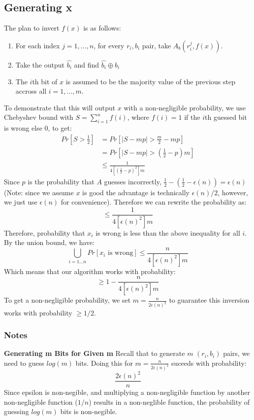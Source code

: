 \documentclass[11pt]{article}
\begin{document}
\subsection{Generating x}
The plan to invert $f(x)$ is as follows:
\begin{enumerate}
    \item For each index $j=1,...,n$, for every $r_i,b_i$ pair, take $A_b(r_i^j, f(x))$.
    \item Take the output $\hat{b_i}$ and find $\hat{b_i} \oplus {b_i}$
    \item The $i$th bit of $x$ is assumed to be the majority value of the previous step accross all $i=1,...,m$.
\end{enumerate}
To demonstrate that this will output $x$ with a non-negligible probability, we use Chebyshev bound with $S = \sum_{i=1}^n f(i)$, where $f(i) = 1$ if the $i$th guessed bit is wrong else 0, to get:
\begin{align*}
    Pr[S > \frac{1}{2}] &= Pr[|S-mp| > \frac{m}{2}-mp]\\
    &= Pr[|S-mp| > (\frac{1}{2}-p)m]\\
    &\leq \frac{1}{4[(\frac{1}{2}-p)^2]m}
\end{align*}
Since $p$ is the probability that $A$ guesses incorrectly, $\frac{1}{2}-(\frac{1}{2}-\epsilon(n)) = \epsilon(n)$ (Note: since we assume $x$ is good the advantage is technically $\epsilon(n)/2$, however, we just use $\epsilon(n)$ for convenience). Therefore we can rewrite the probability as:
$$\leq \frac{1}{4[\epsilon(n)^2]m}$$
Therefore, probability that $x_i$ is wrong is less than the above inequality for all $i$. By the union bound, we have:
$$\underset{i=1...n}{\bigcup} Pr[x_i\text{ is wrong}] \leq \frac{n}{4[\epsilon(n)^2]m}$$
Which means that our algorithm works with probability:
$$\geq 1-\frac{n}{4[\epsilon(n)^2]m}$$
To get a non-negligible probability, we set $m = \frac{n}{2\epsilon(n)^2}$ to guarantee this inversion works with probability $\geq 1/2$.

\subsubsection{Notes}

\textbf{Generating m Bits for Given m}
Recall that to generate $m$ $(r_i,b_i)$ pairs, we need to guess $log(m)$ bits. Doing this for $m=\frac{n}{2\epsilon(n)^2}$ suceeds with probability:
$$\frac{2\epsilon(n)^2}{n}$$
Since epsilon is non-negible, and multiplying a non-negligible function by another non-negligible function ($1/n$) results in a non-neglible function, the probability of guessing $log(m)$ bits is non-negible.
\vspace{1em}
\end{document}
